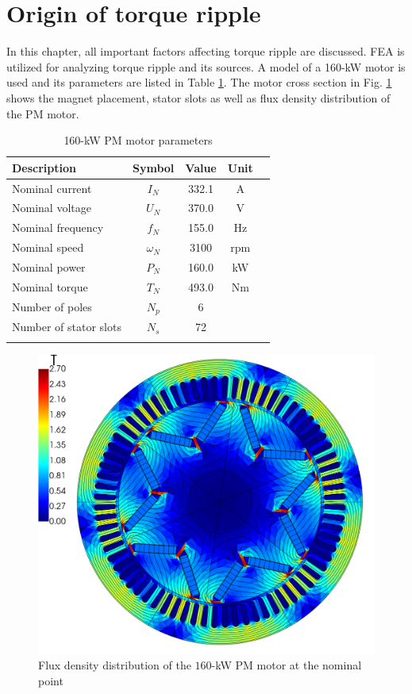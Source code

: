 \section{Origin of torque ripple}

In this chapter, all important factors affecting torque ripple are discussed. FEA is utilized for analyzing torque ripple and its sources. A model of a 160-kW motor is used and its parameters are listed in Table \ref{FEM_motor_params}. The motor cross section in Fig. \ref{FEM_flux} shows the magnet placement, stator slots as well as flux density distribution of the PM motor.

\begin{table}[ht]
\caption{160-kW PM motor parameters}
\centering
\begin{tabular}[t]{lcccc}
\hline
Description       & Symbol     & Value  & Unit\\
\hline
Nominal current   & $I_N$      & 332.1  & A\\
Nominal voltage   & $U_N$      & 370.0  & V\\
Nominal frequency & $f_N$      & 155.0  & Hz\\
Nominal speed     & $\omega_N$ & 3100   & rpm\\
Nominal power     & $P_N$      & 160.0  & kW\\
Nominal torque    & $T_N$      & 493.0  & Nm\\
Number of poles   & $N_p$      & 6     & \\
Number of stator slots & $N_s$ & 72     & \\
\hline
\label{FEM_motor_params}
\end{tabular}
\end{table}%

\begin{figure}[htb] 
    \centering
    \includegraphics[width=0.6\linewidth]{images/flux_density.png} 
    \caption{Flux density distribution of the $160$-kW PM motor at the nominal point} 
    \label{FEM_flux} 
\end{figure}

